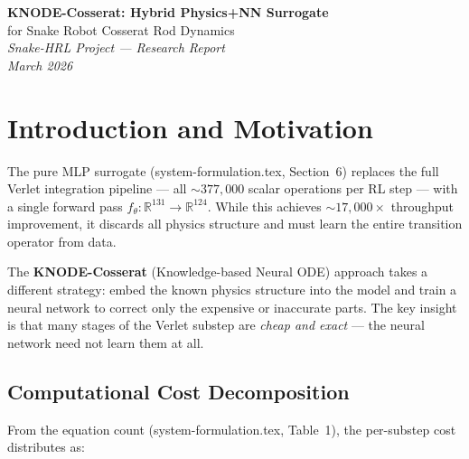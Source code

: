\documentclass[11pt]{article}
\newcommand{\Real}{\mathbb{R}}
\begin{document}

\begin{center}
  {\Large\bfseries KNODE-Cosserat: Hybrid Physics+NN Surrogate} \\[0.3em]
  {\large for Snake Robot Cosserat Rod Dynamics} \\[1.5em]
  \textit{Snake-HRL Project --- Research Report} \\[0.3em]
  \textit{March 2026}
\end{center}

\vspace{1em}

\section{Introduction and Motivation}
\label{sec:intro}

The pure MLP surrogate (system-formulation.tex, Section~6) replaces the full Verlet integration pipeline --- all ${\sim}377{,}000$ scalar operations per RL step --- with a single forward pass $f_\theta\colon \Real^{131} \to \Real^{124}$.
While this achieves ${\sim}17{,}000\times$ throughput improvement, it discards all physics structure and must learn the entire transition operator from data.

The \textbf{KNODE-Cosserat} (Knowledge-based Neural ODE) approach takes a different strategy: embed the known physics structure into the model and train a neural network to correct only the expensive or inaccurate parts.
The key insight is that many stages of the Verlet substep are \emph{cheap and exact} --- the neural network need not learn them at all.

\subsection{Computational Cost Decomposition}

From the equation count (system-formulation.tex, Table~1), the per-substep cost distributes as:
\end{document}
